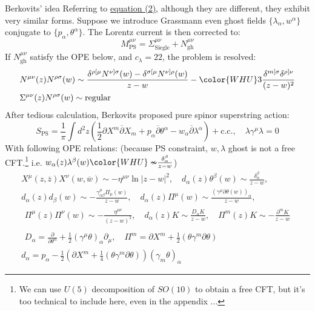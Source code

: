 \documentclass{beamer}
\begin{document}
\begin{frame}[allowframebreaks]{Berkovits' idea}
	Referring to \hyperlink{ope diff}{\color{blue}equation (2)}, although they are different, they exhibit very similar forms. Suppose we introduce Grassmann even ghost fields $\{\lambda_{\alpha},w^{\alpha}\}$ conjugate to $\{p_\alpha,\theta^\alpha\}$. The Lorentz current is then corrected to:
	\begin{equation*}
		M^{\mu\nu}_{\text{PS}}=\Sigma^{\mu\nu}_\text{Siegle}+N_{\text{gh}}^{\mu\nu}
	\end{equation*}
	If $N_{\text{gh}}^{\mu\nu}$ satisfy the OPE below, and $c_{\lambda}=22$, the problem is resolved: \cite{Berkovits:2000fe}
	\begin{equation*}
		\begin{aligned}
			&N^{\mu\nu}(z)N^{\rho\sigma}(w)\sim\frac{\delta^{\rho[\mu}N^{\nu]\sigma}(w)-\delta^{\sigma[\mu}N^{\nu]\rho}(w)}{z-w}-{\color{WHU}3}\frac{\delta^{m[\sigma}\delta^{\rho]\nu}}{(z-w)^2}\\
			&\Sigma^{\mu\nu}(z)N^{\rho\sigma}(w)\sim\mathrm{regular}
		\end{aligned}
	\end{equation*}
	After tedious calculation, Berkovits proposed pure spinor superstring action: 
	\begin{equation*}
		S_{\mathrm{PS}}=\frac{1}{\pi}\int d^2z\left(\frac{1}{2}\partial X^m\overline{\partial}X_m+p_\alpha\overline{\partial}\theta^\alpha-w_\alpha\overline{\partial}\lambda^\alpha\right)+\text{c.c.},\quad \lambda\gamma^\mu\lambda = 0
	\end{equation*}
	With following OPE relations: (because PS constraint, $w,\lambda$ ghost is not a free CFT.\footnote{We can use $U(5)$ decomposition of $SO(10)$ to obtain a free CFT, but it's too technical to include here, even in the appendix ...} i.e. $w_{\alpha}(z)\lambda^{\beta}(w){\color{WHU}\nsim}\frac{\delta_{\alpha}^{\beta}}{z-w}$)
	\vspace*{-4pt}
	\begin{equation*}
		\begin{gathered}
			X^\mu(z,\overline{z})X^\nu(w,\overline{w})\sim-\eta^{\mu\nu}\ln|z-w|^2,\quad d_\alpha(z)\theta^\beta(w)\sim\frac{\delta_\alpha^\beta}{z-w},\\d_\alpha(z)d_\beta(w)\sim-\frac{\gamma_{\alpha\beta}^\mu\Pi_\mu(w)}{z-w},\quad d_\alpha(z)\Pi^\mu(w)\sim\frac{(\gamma^\mu\partial\theta(w))_\alpha}{z-w},\\\begin{aligned}\Pi^\mu(z)\Pi^\nu(w)\sim-\frac{\eta^{\mu\nu}}{(z-w)^2},\quad d_\alpha(z)K\sim\frac{D_\alpha K}{z-w},\quad\Pi^m(z)K\sim-\frac{\partial^mK}{z-w}\end{aligned}\\\begin{aligned}D_\alpha=\frac{\partial}{\partial\theta^\alpha}+\frac{1}{2}(\gamma^\mu\theta)_\alpha\partial_\mu,\quad\Pi^m=\partial X^m+\frac{1}{2}(\theta\gamma^m\partial\theta)\end{aligned}\\d_{\alpha}=p_{\alpha}-\frac{1}{2}\left(\partial X^{m}+\frac{1}{4}(\theta\gamma^{m}\partial\theta)\right)(\gamma_{m}\theta)_{\alpha}

\end{gathered}
\end{equation*}
\end{frame}
\end{document}
